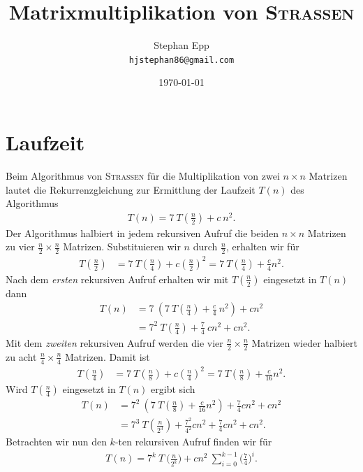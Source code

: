 \documentclass{scrartcl}
\title{Matrixmultiplikation von \normalfont\scshape{Strassen}}
\author{Stephan Epp\\\texttt{hjstephan86@gmail.com}}
\date{\today}
\numberwithin{equation}{section}
\begin{document}
\maketitle
\vspace{5em}
\tableofcontents
\newpage

\section{Laufzeit}
Beim Algorithmus von \textsc{Strassen} für die Multiplikation von zwei $n \times n$ Matrizen lautet die Rekurrenzgleichung zur Ermittlung der Laufzeit $T(n)$ des Algorithmus
\begin{align*}
	T(n) = 7 \: T(\tfrac{n}{2}) + c\: n^2.
\end{align*}
Der Algorithmus halbiert in jedem rekursiven Aufruf die beiden $n \times n$ Matrizen zu vier $\tfrac{n}{2} \times \tfrac{n}{2}$ Matrizen. Substituieren wir $n$ durch $\tfrac{n}{2}$, erhalten wir für
\begin{align*}
	T(\tfrac{n}{2}) &= 7 \: T(\tfrac{n}{4}) + c(\tfrac{n}{2})^2 = 7 \: T(\tfrac{n}{4}) + \tfrac{c}{4}n^2.
\end{align*}
Nach dem \textit{ersten} rekursiven Aufruf erhalten wir mit $T(\frac{n}{2})$ eingesetzt in $T(n)$ dann
\begin{align*}
	T(n) &= 7 \: (7 \: T(\tfrac{n}{4}) + \tfrac{c}{4} \: n^2) + c n^2 \\
	&= 7^2\: T(\tfrac{n}{4}) + \tfrac{7}{4} \: cn^2 + c n^2.
\end{align*}
Mit dem \textit{zweiten} rekursiven Aufruf werden die vier $\tfrac{n}{2} \times \tfrac{n}{2}$ Matrizen wieder halbiert zu acht $\tfrac{n}{4} \times \tfrac{n}{4}$ Matrizen. Damit ist
\begin{align*}
	T(\tfrac{n}{4}) &= 7 \: T(\tfrac{n}{8}) + c(\tfrac{n}{4})^2 = 7 \: T(\tfrac{n}{8}) + \tfrac{c}{16}n^2.
\end{align*}
Wird $T(\tfrac{n}{4})$ eingesetzt in $T(n)$ ergibt sich
\begin{align*}
	T(n) &= 7^2\: (7 \: T(\tfrac{n}{8}) + \tfrac{c}{16}n^2) + \tfrac{7}{4}cn^2 + c n^2 \\
	&= 7^3\: T(\tfrac{n}{2^3}) + \tfrac{7^2}{4^2}cn^2 + \tfrac{7}{4}cn^2 + c n^2.
\end{align*}
Betrachten wir nun den $k$-ten rekursiven Aufruf finden wir für 
\begin{align*}
	T(n) = 7^k \: T \: \big(\tfrac{n}{2^k}\big) + cn^2 \: \sum_{i = 0}^{k-1} \bigg(\frac{7}{4}\bigg)^i.
\end{align*}
\end{document}
